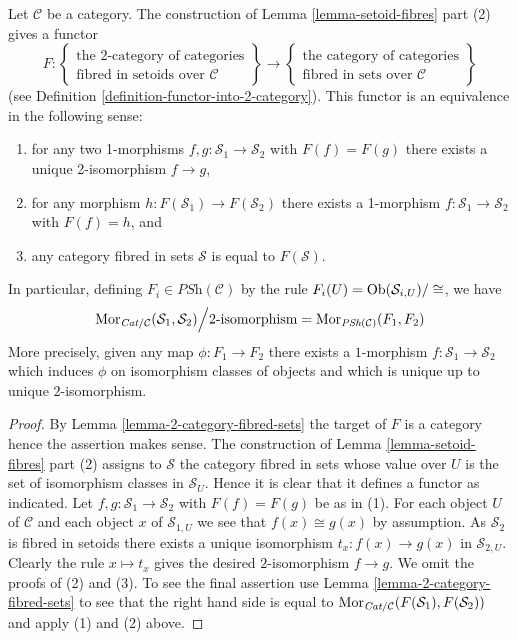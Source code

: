 \begin{lemma}
\label{lemma-2-category-fibred-setoids}
Let $\mathcal{C}$ be a category. The construction of
Lemma \ref{lemma-setoid-fibres}
part (2) gives a functor
$$
F :
\left\{
\begin{matrix}
\text{the 2-category of categories}\\
\text{fibred in setoids over }\mathcal{C}
\end{matrix}
\right\}
\longrightarrow
\left\{
\begin{matrix}
\text{the category of categories}\\
\text{fibred in sets over }\mathcal{C}
\end{matrix}
\right\}
$$
(see
Definition \ref{definition-functor-into-2-category}).
This functor is an equivalence in the following sense:
\begin{enumerate}
\item for any two 1-morphisms $f, g : \mathcal{S}_1 \to \mathcal{S}_2$
with $F(f) = F(g)$ there exists a unique 2-isomorphism $f \to g$,
\item for any morphism $h : F(\mathcal{S}_1) \to F(\mathcal{S}_2)$
there exists a 1-morphism $f : \mathcal{S}_1 \to \mathcal{S}_2$
with $F(f) = h$, and
\item any category fibred in sets $\mathcal{S}$ is equal to $F(\mathcal{S})$.
\end{enumerate}
In particular, defining $F_i \in \textit{PSh}(\mathcal{C})$ by the
rule $F_i(U) = \mathop{\mathrm{Ob}}\nolimits(\mathcal{S}_{i, U})/\cong$, we have
$$
\mathop{\mathrm{Mor}}\nolimits_{\textit{Cat}/\mathcal{C}}(\mathcal{S}_1, \mathcal{S}_2)
\Big/
2\text{-isomorphism}
=
\mathop{\mathrm{Mor}}\nolimits_{\textit{PSh}(\mathcal{C})}(F_1, F_2)
$$
More precisely, given any map $\phi : F_1 \to F_2$ there exists a
$1$-morphism $f : \mathcal{S}_1 \to \mathcal{S}_2$ which induces
$\phi$ on isomorphism classes of objects and
which is unique up to unique $2$-isomorphism.
\end{lemma}

\begin{proof}
By
Lemma \ref{lemma-2-category-fibred-sets}
the target of $F$ is a category hence the assertion makes sense.
The construction of
Lemma \ref{lemma-setoid-fibres} part (2)
assigns to $\mathcal{S}$ the category fibred in sets whose value over
$U$ is the set of isomorphism classes in $\mathcal{S}_U$. Hence it
is clear that it defines a functor as indicated.
Let $f, g : \mathcal{S}_1 \to \mathcal{S}_2$
with $F(f) = F(g)$ be as in (1). For each object $U$ of $\mathcal{C}$
and each object $x$ of $\mathcal{S}_{1, U}$ we see that $f(x) \cong g(x)$
by assumption. As $\mathcal{S}_2$ is fibred in setoids there exists
a unique isomorphism $t_x : f(x) \to g(x)$ in $\mathcal{S}_{2, U}$.
Clearly the rule $x \mapsto t_x$ gives the desired $2$-isomorphism
$f \to g$. We omit the proofs of (2) and (3).
To see the final assertion use
Lemma \ref{lemma-2-category-fibred-sets}
to see that the right hand side is equal to
$\mathop{\mathrm{Mor}}\nolimits_{\textit{Cat}/\mathcal{C}}(F(\mathcal{S}_1), F(\mathcal{S}_2))$
and apply (1) and (2) above.
\end{proof}


